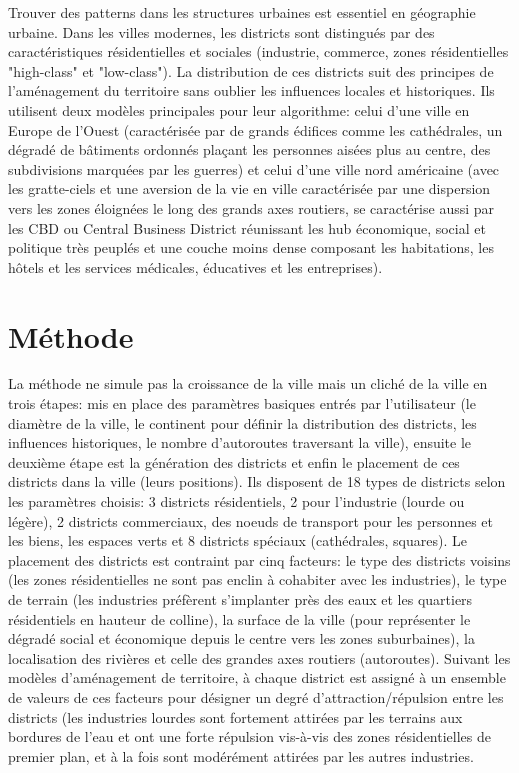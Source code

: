 \documentclass[11pt]{article}
\begin{document}
Trouver des patterns dans les structures urbaines est essentiel en géographie urbaine. Dans les villes modernes, les districts sont distingués par des caractéristiques résidentielles et sociales (industrie, commerce, zones résidentielles "high-class" et "low-class").
La distribution de ces districts suit des principes de l'aménagement du territoire sans oublier les influences locales et historiques. Ils utilisent deux modèles principales pour leur algorithme: celui d'une ville en Europe de l'Ouest (caractérisée par de grands édifices comme les cathédrales, un dégradé de bâtiments ordonnés plaçant les personnes aisées plus au centre, des subdivisions marquées par les guerres) et celui d'une ville nord américaine (avec les gratte-ciels et une aversion de la vie en ville caractérisée par une dispersion vers les zones éloignées le long des grands axes routiers, se caractérise aussi par les CBD ou Central Business District réunissant les hub économique, social et politique très peuplés et une couche moins dense composant les habitations, les hôtels et les services médicales, éducatives et les entreprises).

\section{Méthode}

La méthode ne simule pas la croissance de la ville mais un cliché de la ville en trois étapes: mis en place des paramètres basiques entrés par l'utilisateur (le diamètre de la ville, le continent pour définir la distribution des districts, les influences historiques, le nombre d'autoroutes traversant la ville), ensuite le deuxième étape est la génération des districts et enfin le placement de ces districts dans la ville (leurs positions). Ils disposent de 18 types de districts selon les paramètres choisis: 3 districts résidentiels, 2 pour l'industrie (lourde ou légère), 2 districts commerciaux, des noeuds de transport pour les personnes et les biens, les espaces verts et 8 districts spéciaux (cathédrales, squares).
Le placement des districts est contraint par cinq facteurs: le type des districts voisins (les zones résidentielles ne sont pas enclin à cohabiter avec les industries), le type de terrain (les industries préfèrent s'implanter près des eaux et les quartiers résidentiels en hauteur de colline), la surface de la ville (pour représenter le dégradé social et économique depuis le centre vers les zones suburbaines), la localisation des rivières et celle des grandes axes routiers (autoroutes).
Suivant les modèles d'aménagement de territoire, à chaque district est assigné à un ensemble de valeurs de ces facteurs pour désigner un degré d'attraction/répulsion entre les districts (les industries lourdes sont fortement attirées par les terrains aux bordures de l'eau et ont une forte répulsion vis-à-vis des zones résidentielles de premier plan, et à la fois sont modérément attirées par les autres industries.
\end{document}
